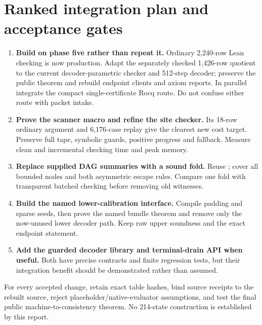 \documentclass[11pt]{article}
\newcommand{\file}[1]{{\small\path{#1}}}
\begin{document}
\section{Ranked integration plan and acceptance gates}
\begin{enumerate}
\item \textbf{Build on phase five rather than repeat it.} Ordinary 2,240-row Lean checking is now production. Adapt the separately checked 1,426-row quotient to the current decoder-parametric checker and 512-step decoder; preserve the public theorem and rebuild endpoint clients and axiom reports. In parallel integrate the compact single-certificate Rocq route. Do not confuse either route with packet intake.
\item \textbf{Prove the scanner macro and refine the site checker.} Its 18-row ordinary argument and 6,176-case replay give the clearest new cost target. Preserve full tape, symbolic guards, positive progress and fallback. Measure clean and incremental checking time and peak memory.
\item \textbf{Replace supplied DAG summaries with a sound fold.} Reuse \file{RMEquiv.WF}; cover all bounded nodes and both asymmetric escape rules. Compare one fold with transparent batched checking before removing old witnesses.
\item \textbf{Build the named lower-calibration interface.} Compile padding and sparse seeds, then prove the named bundle theorem and remove only the now-unused lower decoder path. Keep raw upper soundness and the exact endpoint statement.
\item \textbf{Add the guarded decoder library and terminal-drain API when useful.} Both have precise contracts and finite regression tests, but their integration benefit should be demonstrated rather than assumed.
\end{enumerate}
For every accepted change, retain exact table hashes, bind source receipts to the rebuilt source, reject placeholder/native-evaluator assumptions, and test the final public machine-to-consistency theorem. No 214-state construction is established by this report.
\end{document}
